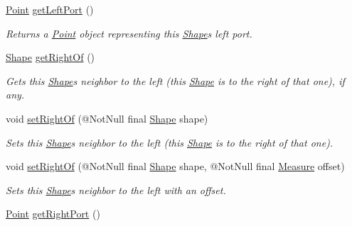 \begin{DoxyCompactItemize}
\hyperlink{classcom_1_1aarrelaakso_1_1drawl_1_1_point}{Point} \hyperlink{classcom_1_1aarrelaakso_1_1drawl_1_1_shape_aeffa96786ca552adf46924ec77da9555}{get\+Left\+Port} ()
\begin{DoxyCompactList}\small\item\em Returns a \hyperlink{classcom_1_1aarrelaakso_1_1drawl_1_1_point}{Point} object representing this \hyperlink{classcom_1_1aarrelaakso_1_1drawl_1_1_shape}{Shape}\textquotesingle{}s left port. \end{DoxyCompactList}\item 
\hyperlink{classcom_1_1aarrelaakso_1_1drawl_1_1_shape}{Shape} \hyperlink{classcom_1_1aarrelaakso_1_1drawl_1_1_shape_a1ad573b06f341aa79f6a255a476ae6e4}{get\+Right\+Of} ()
\begin{DoxyCompactList}\small\item\em Gets this \hyperlink{classcom_1_1aarrelaakso_1_1drawl_1_1_shape}{Shape}\textquotesingle{}s neighbor to the left (this \hyperlink{classcom_1_1aarrelaakso_1_1drawl_1_1_shape}{Shape} is to the right of that one), if any. \end{DoxyCompactList}\item 
void \hyperlink{classcom_1_1aarrelaakso_1_1drawl_1_1_shape_a3cada5e03bd1552a79702d2945c7ed01}{set\+Right\+Of} (@Not\+Null final \hyperlink{classcom_1_1aarrelaakso_1_1drawl_1_1_shape}{Shape} shape)
\begin{DoxyCompactList}\small\item\em Sets this \hyperlink{classcom_1_1aarrelaakso_1_1drawl_1_1_shape}{Shape}\textquotesingle{}s neighbor to the left (this \hyperlink{classcom_1_1aarrelaakso_1_1drawl_1_1_shape}{Shape} is to the right of that one). \end{DoxyCompactList}\item 
void \hyperlink{classcom_1_1aarrelaakso_1_1drawl_1_1_shape_a89e85848d24dca0fa60ff68d169eef11}{set\+Right\+Of} (@Not\+Null final \hyperlink{classcom_1_1aarrelaakso_1_1drawl_1_1_shape}{Shape} shape, @Not\+Null final \hyperlink{classcom_1_1aarrelaakso_1_1drawl_1_1_measure}{Measure} offset)
\begin{DoxyCompactList}\small\item\em Sets this \hyperlink{classcom_1_1aarrelaakso_1_1drawl_1_1_shape}{Shape}\textquotesingle{}s neighbor to the left with an offset. \end{DoxyCompactList}\item 
\hyperlink{classcom_1_1aarrelaakso_1_1drawl_1_1_point}{Point} \hyperlink{classcom_1_1aarrelaakso_1_1drawl_1_1_shape_a319c78d425ec91e1aef1072a95e349ad}{get\+Right\+Port} ()

\end{DoxyCompactItemize}
